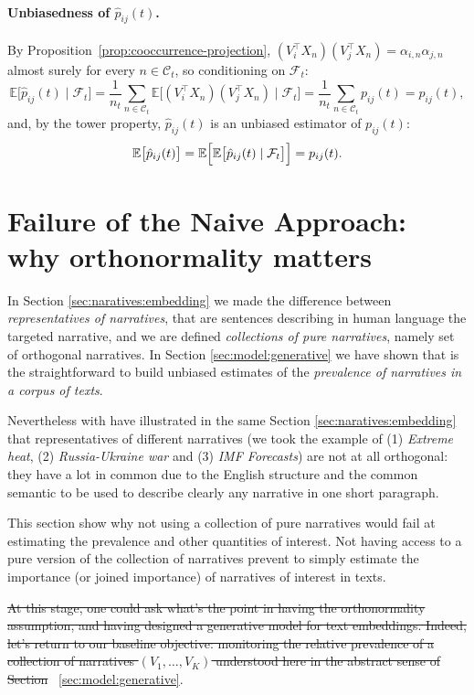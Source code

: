 \documentclass[
  journal=medium,
  manuscript=article-type,
  year=2025,
  volume=1,
]{cup-journal}
\begin{document}
\paragraph{Unbiasedness of $\hat p_{ij}(t)$.}
By Proposition~\ref{prop:cooccurrence-projection}, $(V_i^\top X_n)(V_j^\top
X_n) = \alpha_{i,n}\alpha_{j,n}$ almost surely for every $n\in\mathcal C_t$,
so conditioning on $\mathcal F_t$:
\begin{equation}
    \mathbb E\bigl[\hat p_{ij}(t) \mid \mathcal F_t\bigr]
    = \frac{1}{n_t} \sum_{n\in\mathcal C_t} \mathbb E\bigl[(V_i^\top X_n)(V_j^\top X_n) \mid \mathcal F_t\bigr]
    = \frac{1}{n_t} \sum_{n\in\mathcal C_t} p_{ij}(t)
    = p_{ij}(t),
\end{equation}
and, by the tower property, $\hat p_{ij}(t)$ is an unbiased estimator of
$p_{ij}(t)$:
\begin{equation}
    \mathbb E\bigl[\hat p_{ij}(t)\bigr]
    = \mathbb E\Bigl[\mathbb E\bigl[\hat p_{ij}(t) \mid \mathcal F_t\bigr]\Bigr]
    = p_{ij}(t).
\end{equation}

\section{Failure of the Naive Approach: why orthonormality matters}
\label{sec:naive-failure}

{\color{ForestGreen}
In Section \ref{sec:naratives:embedding} we made the difference between \emph{representatives of narratives}, that are sentences describing in human language the targeted narrative, 
and we are defined \emph{collections of pure narratives}, namely set of orthogonal narratives.
In Section \ref{sec:model:generative} we have shown that is the straightforward to build unbiased estimates of the \emph{prevalence of narratives in a corpus of texts}.

Nevertheless with have illustrated in the same Section \ref{sec:naratives:embedding} that representatives of different narratives (we took the example of (1) \emph{Extreme heat}, (2) \emph{Russia-Ukraine war} and (3) \emph{IMF Forecasts}) are not at all orthogonal: they have a lot in common due to the English structure and the common semantic to be used to describe clearly any narrative in one short paragraph.

This section show why not using a collection of pure narratives would fail at estimating the prevalence and other quantities of interest. Not having access to a pure version of the collection of narratives prevent to simply estimate the importance (or joined importance) of narratives of interest in texts.
}
\st{At this stage, one could ask what's the point in having the orthonormality assumption, and having designed a generative model for text embeddings. Indeed, let's return to our baseline objective: monitoring the relative prevalence of a collection of narratives $(V_1, \ldots, V_K)$ understood here in the
abstract sense of Section} ~\ref{sec:model:generative}. 
\end{document}
